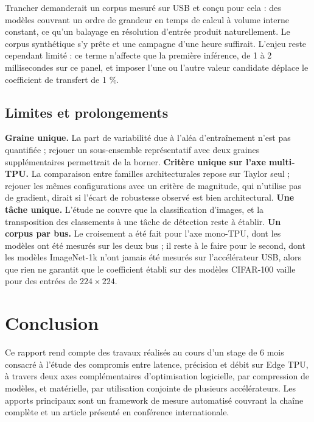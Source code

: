 \documentclass[11pt,a4paper]{report}
\begin{document}
Trancher demanderait un corpus mesuré sur USB et conçu pour cela : des modèles couvrant un ordre de grandeur en temps de calcul à volume interne constant, ce qu'un balayage en résolution d'entrée produit naturellement. Le corpus synthétique s'y prête et une campagne d'une heure suffirait. L'enjeu reste cependant limité : ce terme n'affecte que la première inférence, de 1 à 2 millisecondes sur ce panel, et imposer l'une ou l'autre valeur candidate déplace le coefficient de transfert de 1 \%.

\section{Limites et prolongements}

\textbf{Graine unique.} La part de variabilité due à l'aléa d'entraînement n'est pas quantifiée ; rejouer un sous-ensemble représentatif avec deux graines supplémentaires permettrait de la borner. \textbf{Critère unique sur l'axe multi-TPU.} La comparaison entre familles architecturales repose sur Taylor seul ; rejouer les mêmes configurations avec un critère de magnitude, qui n'utilise pas de gradient, dirait si l'écart de robustesse observé est bien architectural. \textbf{Une tâche unique.} L'étude ne couvre que la classification d'images, et la transposition des classements à une tâche de détection reste à établir. \textbf{Un corpus par bus.} Le croisement a été fait pour l'axe mono-TPU, dont les modèles ont été mesurés sur les deux bus ; il reste à le faire pour le second, dont les modèles ImageNet-1k n'ont jamais été mesurés sur l'accélérateur USB, alors que rien ne garantit que le coefficient établi sur des modèles CIFAR-100 vaille pour des entrées de $224 \times 224$.

\chapter{Conclusion}
\label{chap:conclusion}

Ce rapport rend compte des travaux réalisés au cours d'un stage de 6 mois consacré à l'étude des compromis entre latence, précision et débit sur Edge TPU, à travers deux axes complémentaires d'optimisation logicielle, par compression de modèles, et matérielle, par utilisation conjointe de plusieurs accélérateurs. Les apports principaux sont un framework de mesure automatisé couvrant la chaîne complète et un article présenté en conférence internationale.
\end{document}
